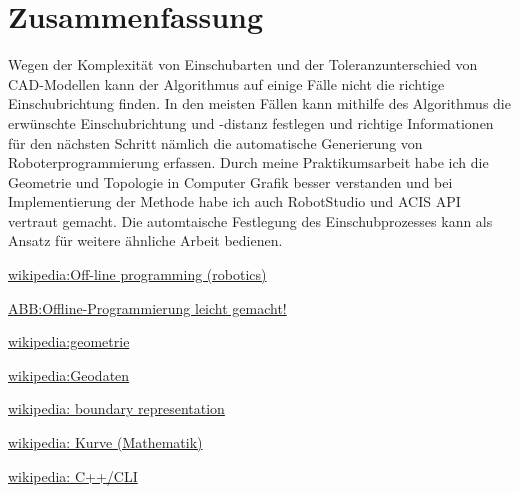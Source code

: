 \documentclass[14pt,a4paper,titlepage]{article}
\begin{document}
	\section{Zusammenfassung}
		Wegen der Komplexität von Einschubarten und der Toleranzunterschied von CAD-Modellen kann der Algorithmus auf einige Fälle nicht die richtige Einschubrichtung finden. In den meisten Fällen kann mithilfe des Algorithmus die erwünschte Einschubrichtung und -distanz festlegen und richtige Informationen für den nächsten Schritt nämlich die automatische Generierung von Roboterprogrammierung erfassen. Durch meine Praktikumsarbeit habe ich die Geometrie und Topologie in Computer Grafik besser verstanden und bei Implementierung der Methode habe ich auch RobotStudio und ACIS API vertraut gemacht. Die automtaische Festlegung des Einschubprozesses kann als Ansatz für weitere ähnliche Arbeit bedienen.
	\pagebreak
	\begin{thebibliography}{1}
		\href{https://en.wikipedia.org/wiki/Off-line_programming_(robotics)}{wikipedia:Off-line programming (robotics)}
		
		\href{https://new.abb.com/products/robotics/de/robotstudio}{ABB:Offline-Programmierung leicht gemacht!}
		
		\href{https://de.wikipedia.org/wiki/Geometrie}{wikipedia:geometrie}
	
		
		\href{https://de.wikipedia.org/wiki/Geodaten#Topologie}{wikipedia:Geodaten}
		
		\href{https://en.wikipedia.org/wiki/Boundary_representation}{wikipedia: boundary representation}
		
		\href{https://de.wikipedia.org/wiki/Kurve_(Mathematik)}{wikipedia: Kurve (Mathematik)}
		
		\href{https://de.wikipedia.org/wiki/C%2B%2B/CLI}{wikipedia: C++/CLI}
	\end{thebibliography}
	\pagebreak
	\listoffigures
	\pagebreak
\end{document}
